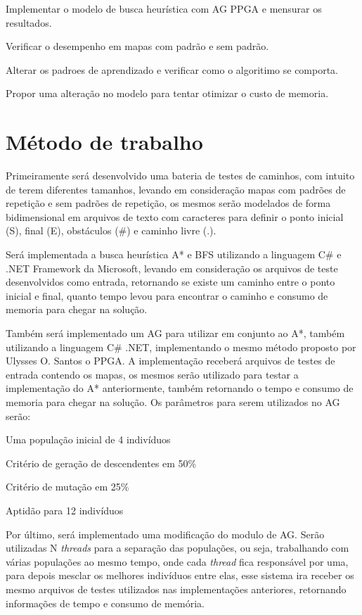 Implementar o modelo de busca heurística com AG PPGA e mensurar os resultados.

Verificar o desempenho em mapas com padrão e sem padrão.

Alterar os padroes de aprendizado e verificar como o algoritimo se comporta.

Propor uma alteração no modelo para tentar otimizar o custo de memoria.


\section{Método de trabalho}

Primeiramente será desenvolvido uma bateria de testes de caminhos, com intuito de terem diferentes tamanhos, levando em consideração mapas com padrões de repetição e sem padrões de repetição, os mesmos serão modelados de forma bidimensional em arquivos de texto com caracteres para definir o ponto inicial (S), final (E), obstáculos (\#) e caminho livre (.).

Será implementada a busca heurística A* e BFS utilizando a linguagem C\# e .NET Framework da Microsoft, levando em consideração os arquivos de teste desenvolvidos como entrada, retornando se existe um caminho entre o ponto inicial e final, quanto tempo levou para encontrar o caminho e consumo de memoria para chegar na solução.

Também será implementado um AG para utilizar em conjunto ao A*, também utilizando a linguagem C\# .NET, implementando o mesmo método proposto por Ulysses O. Santos \cite{Ulysses} o PPGA. A implementação receberá  arquivos de testes de entrada contendo os mapas, os mesmos serão utilizado para testar a implementação do A* anteriormente, também retornando o tempo e consumo de memoria para chegar na solução. Os parâmetros para serem utilizados no AG serão:

Uma população inicial de 4 indivíduos

Critério de geração de descendentes em 50\%

Critério de mutação em 25\% 

Aptidão para 12 indivíduos

Por último, será implementado uma modificação do modulo de AG. Serão utilizadas N \textit{threads} para a separação das populações, ou seja, trabalhando com várias populações ao mesmo tempo, onde cada \textit{thread} fica responsável por uma, para depois mesclar os melhores indivíduos entre elas, esse sistema ira receber os mesmo arquivos de testes utilizados nas implementações anteriores, retornando informações de tempo e consumo de memória.

